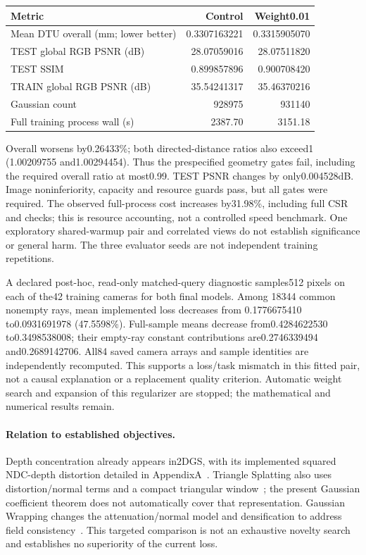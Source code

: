 \documentclass[11pt,a4paper]{article}
\begin{document}
\begin{center}
\begin{tabular}{lrr}
\toprule
Metric & Control & Weight0.01\\
\midrule
Mean DTU overall (mm; lower better) & 0.3307163221 & 0.3315905070\\
TEST global RGB PSNR (dB) & 28.07059016 & 28.07511820\\
TEST SSIM & 0.899857896 & 0.900708420\\
TRAIN global RGB PSNR (dB) & 35.54241317 & 35.46370216\\
Gaussian count & 928975 & 931140\\
Full training process wall (s) & 2387.70 & 3151.18\\
\bottomrule
\end{tabular}
\end{center}
Overall worsens by0.26433\%; both directed-distance ratios also exceed1
(1.00209755 and1.00294454). Thus the prespecified geometry gates fail,
including the required overall ratio at most0.99. TEST PSNR changes by
only0.004528dB. Image noninferiority, capacity and resource guards pass,
but all gates were required. The observed full-process cost increases
by31.98\%, including full CSR and checks; this is resource accounting,
not a controlled speed benchmark. One exploratory shared-warmup pair
and correlated views do not establish significance or general harm.
The three evaluator seeds are not independent training repetitions.

A declared post-hoc, read-only matched-query diagnostic samples512
pixels on each of the42 training cameras for both final models. Among
18344 common nonempty rays, mean implemented loss decreases from
0.1776675410 to0.0931691978 (47.5598\%). Full-sample means decrease
from0.4284622530 to0.3498538008; their empty-ray constant contributions
are0.2746339494 and0.2689142706. All84 saved camera arrays and sample
identities are independently recomputed. This supports a loss/task
mismatch in this fitted pair, not a causal explanation or a replacement
quality criterion. Automatic weight search and expansion of this
regularizer are stopped; the mathematical and numerical results remain.

\paragraph{Relation to established objectives.}
Depth concentration already appears in2DGS, with its implemented squared
NDC-depth distortion detailed in AppendixA~\cite{twodgs}. Triangle
Splatting also uses distortion/normal terms and a compact triangular
window~\cite{trianglesplat}; the present Gaussian coefficient theorem
does not automatically cover that representation. Gaussian Wrapping
changes the attenuation/normal model and densification to address field
consistency~\cite{wrapping}. This targeted comparison is not an exhaustive
novelty search and establishes no superiority of the current loss.
\end{document}
